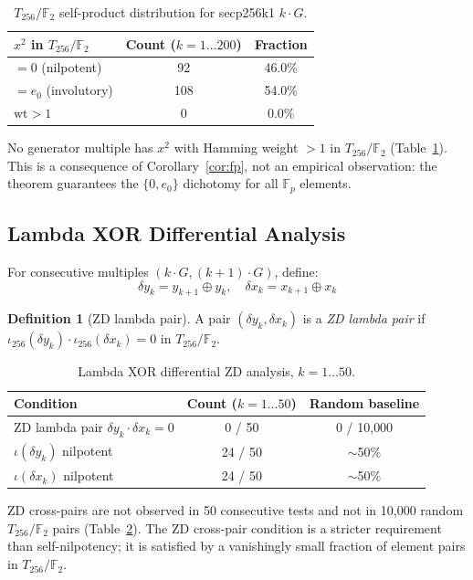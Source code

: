 \documentclass[runningheads]{llncs}
\theoremstyle{plain}
\theoremstyle{definition}
\newtheorem{definition}[theorem]{Definition}
\newcommand{\GFtwo}{\mathbb{F}_2}
\newcommand{\hw}{\mathrm{wt}}
\newcommand{\Fp}{\mathbb{F}_p}
\begin{document}
\begin{table}[h]
\centering
\caption{$T_{256}/\GFtwo$ self-product distribution for secp256k1 $k \cdot G$.}
\label{tab:kG}
\begin{tabular}{lcc}
\toprule
$x^2$ in $T_{256}/\GFtwo$ & Count ($k=1\ldots 200$) & Fraction \\
\midrule
$= 0$ (nilpotent) & 92 & 46.0\% \\
$= e_0$ (involutory) & 108 & 54.0\% \\
$\hw > 1$ & 0 & 0.0\% \\
\bottomrule
\end{tabular}
\end{table}

No generator multiple has $x^2$ with Hamming weight $> 1$ in $T_{256}/\GFtwo$
(Table~\ref{tab:kG}). This is a consequence of Corollary~\ref{cor:fp}, not an
empirical observation: the theorem guarantees the $\{0, e_0\}$ dichotomy for
all $\Fp$ elements.

\subsection{Lambda XOR Differential Analysis}

For consecutive multiples $(k \cdot G, (k+1) \cdot G)$, define:
\[
\delta y_k = y_{k+1} \oplus y_k, \quad \delta x_k = x_{k+1} \oplus x_k
\]

\begin{definition}[ZD lambda pair]
A pair $(\delta y_k, \delta x_k)$ is a \emph{ZD lambda pair} if
$\iota_{256}(\delta y_k) \cdot \iota_{256}(\delta x_k) = 0$ in $T_{256}/\GFtwo$.
\end{definition}

\begin{table}[h]
\centering
\caption{Lambda XOR differential ZD analysis, $k=1\ldots 50$.}
\label{tab:lambda}
\begin{tabular}{lcc}
\toprule
Condition & Count ($k=1\ldots 50$) & Random baseline \\
\midrule
ZD lambda pair $\delta y_k \cdot \delta x_k = 0$ & 0 / 50 & 0 / 10{,}000 \\
$\iota(\delta y_k)$ nilpotent & 24 / 50 & $\sim$50\% \\
$\iota(\delta x_k)$ nilpotent & 24 / 50 & $\sim$50\% \\
\bottomrule
\end{tabular}
\end{table}

ZD cross-pairs are not observed in 50 consecutive tests and not in 10,000
random $T_{256}/\GFtwo$ pairs (Table~\ref{tab:lambda}). The ZD cross-pair
condition is a stricter requirement than self-nilpotency; it is satisfied by
a vanishingly small fraction of element pairs in $T_{256}/\GFtwo$.
\end{document}
